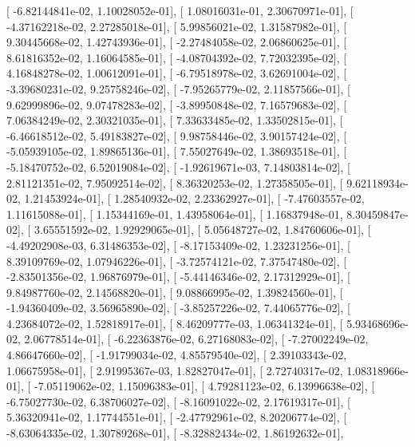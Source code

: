\documentclass{article}
\begin{document}
       [ -6.82144841e-02,   1.10028052e-01],
       [  1.08016031e-01,   2.30670971e-01],
       [ -4.37162218e-02,   2.27285018e-01],
       [  5.99856021e-02,   1.31587982e-01],
       [  9.30445668e-02,   1.42743936e-01],
       [ -2.27484058e-02,   2.06860625e-01],
       [  8.61816352e-02,   1.16064585e-01],
       [ -4.08704392e-02,   7.72032395e-02],
       [  4.16848278e-02,   1.00612091e-01],
       [ -6.79518978e-02,   3.62691004e-02],
       [ -3.39680231e-02,   9.25758246e-02],
       [ -7.95265779e-02,   2.11857566e-01],
       [  9.62999896e-02,   9.07478283e-02],
       [ -3.89950848e-02,   7.16579683e-02],
       [  7.06384249e-02,   2.30321035e-01],
       [  7.33633485e-02,   1.33502815e-01],
       [ -6.46618512e-02,   5.49183827e-02],
       [  9.98758446e-02,   3.90157424e-02],
       [ -5.05939105e-02,   1.89865136e-01],
       [  7.55027649e-02,   1.38693518e-01],
       [ -5.18470752e-02,   6.52019084e-02],
       [ -1.92619671e-03,   7.14803814e-02],
       [  2.81121351e-02,   7.95092514e-02],
       [  8.36320253e-02,   1.27358505e-01],
       [  9.62118934e-02,   1.21453924e-01],
       [  1.28540932e-02,   2.23362927e-01],
       [ -7.47603557e-02,   1.11615088e-01],
       [  1.15344169e-01,   1.43958064e-01],
       [  1.16837948e-01,   8.30459847e-02],
       [  3.65551592e-02,   1.92929065e-01],
       [  5.05648727e-02,   1.84760606e-01],
       [ -4.49202908e-03,   6.31486353e-02],
       [ -8.17153409e-02,   1.23231256e-01],
       [  8.39109769e-02,   1.07946226e-01],
       [ -3.72574121e-02,   7.37547480e-02],
       [ -2.83501356e-02,   1.96876979e-01],
       [ -5.44146346e-02,   2.17312929e-01],
       [  9.84987760e-02,   2.14568820e-01],
       [  9.08866995e-02,   1.39824560e-01],
       [ -1.94360409e-02,   3.56965890e-02],
       [ -3.85257226e-02,   7.44065776e-02],
       [  4.23684072e-02,   1.52818917e-01],
       [  8.46209777e-03,   1.06341324e-01],
       [  5.93468696e-02,   2.06778514e-01],
       [ -6.22363876e-02,   6.27168083e-02],
       [ -7.27002249e-02,   4.86647660e-02],
       [ -1.91799034e-02,   4.85579540e-02],
       [  2.39103343e-02,   1.06675958e-01],
       [  2.91995367e-03,   1.82827047e-01],
       [  2.72740317e-02,   1.08318966e-01],
       [ -7.05119062e-02,   1.15096383e-01],
       [  4.79281123e-02,   6.13996638e-02],
       [ -6.75027730e-02,   6.38706027e-02],
       [ -8.16091022e-02,   2.17619317e-01],
       [  5.36320941e-02,   1.17744551e-01],
       [ -2.47792961e-02,   8.20206774e-02],
       [ -8.63064335e-02,   1.30789268e-01],
       [ -8.32882434e-02,   1.86192632e-01],
\end{document}
